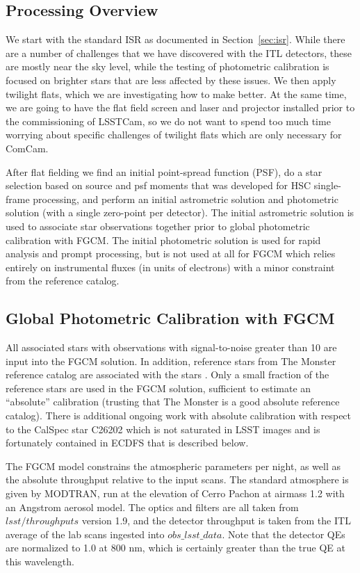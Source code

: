 \subsection{Processing Overview}

We start with the standard ISR as documented in Section~\ref{sec:isr}. While
there are a number of challenges that we have discovered with the ITL
detectors, these are mostly near the sky level, while the testing of
photometric calibration is focused on brighter stars that are less affected by
these issues. We then apply twilight flats, which we are investigating how to
make better. At the same time, we are going to have the flat field screen and
laser and projector installed prior to the commissioning of LSSTCam, so we do
not want to spend too much time worrying about specific challenges of twilight
flats which are only necessary for ComCam.

After flat fielding we find an initial point-spread function (PSF), do a star
selection based on source and psf moments that was developed for HSC
single-frame processing, and perform an initial astrometric solution and
photometric solution (with a single zero-point per detector).  The initial
astrometric solution is used to associate star observations together prior to
global photometric calibration with FGCM.  The initial photometric solution is
used for rapid analysis and prompt processing, but is not used at all for FGCM
which relies entirely on instrumental fluxes (in units of electrons) with a
minor constraint from the reference catalog.

\subsection{Global Photometric Calibration with FGCM}

All associated stars with observations with signal-to-noise greater than 10 are
input into the FGCM solution.  In addition, reference stars from The Monster
reference catalog are associated with the stars .  Only a small fraction of the
reference stars are used in the FGCM solution, sufficient to estimate an
``absolute'' calibration (trusting that The Monster is a good absolute
reference catalog).  There is additional ongoing work with absolute calibration
with respect to the CalSpec star C26202 which is not saturated in LSST images
and is fortunately contained in ECDFS that is described below.

The FGCM model constrains the atmospheric parameters per night, as well as the
absolute throughput relative to the input scans.  The standard atmosphere is
given by MODTRAN, run at the elevation of Cerro Pachon at airmass 1.2 with an
Angstrom aerosol model.  The optics and filters are all taken from
$lsst/throughputs$ version 1.9, and the detector throughput is taken from the
ITL average of the lab scans ingested into $obs\_lsst\_data$.  Note that the
detector QEs are normalized to 1.0 at 800 nm, which is certainly
greater than the true QE at this wavelength.

